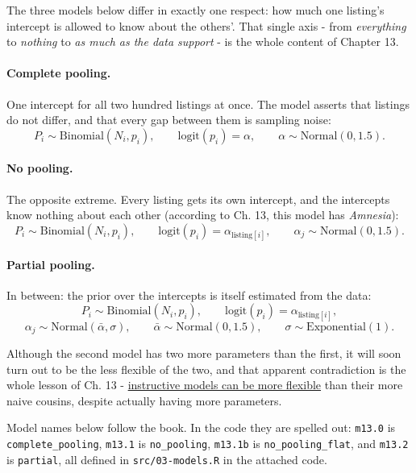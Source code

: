 \documentclass[11pt,a4paper]{article}
\begin{document}
The three models below differ in exactly one respect: how much one listing's
intercept is allowed to know about the others'. That single axis - from
\emph{everything} to \emph{nothing} to \emph{as much as the data support} - is
the whole content of Chapter 13.

\paragraph{Complete pooling.} One intercept for all two hundred listings at
once. The model asserts that listings do not differ, and that every gap between
them is sampling noise:
\[
  P_i \sim \text{Binomial}(N_i, p_i), \qquad
  \text{logit}(p_i) = \alpha, \qquad
  \alpha \sim \text{Normal}(0, 1.5).
\]

\paragraph{No pooling.} The opposite extreme. Every listing gets its own
intercept, and the intercepts
know nothing about each other (according to Ch. 13, this model has \textit{Amnesia}):
\[
  P_i \sim \text{Binomial}(N_i, p_i), \qquad
  \text{logit}(p_i) = \alpha_{\text{listing}[i]}, \qquad
  \alpha_j \sim \text{Normal}(0, 1.5).
\]

\paragraph{Partial pooling.} In between: the prior over the intercepts is itself
estimated from the data:
\[
  P_i \sim \text{Binomial}(N_i, p_i), \qquad
  \text{logit}(p_i) = \alpha_{\text{listing}[i]},
\]
\[
  \alpha_j \sim \text{Normal}(\bar\alpha, \sigma), \qquad
  \bar\alpha \sim \text{Normal}(0, 1.5), \qquad
  \sigma \sim \text{Exponential}(1).
\]

\begin{notebox}
Although the second model has two more parameters than the first, it will soon turn out to be
the less flexible of the two, and that apparent contradiction is the whole
lesson of Ch. 13 - \underline{instructive models can be more flexible} than their more naive cousins, despite actually having more parameters.
\end{notebox}
Model names below follow the book. In the code they are spelled out:
\texttt{m13.0} is \texttt{complete\_pooling}, \texttt{m13.1} is
\texttt{no\_pooling}, \texttt{m13.1b} is \texttt{no\_pooling\_flat}, and
\texttt{m13.2} is \texttt{partial}, all defined in \texttt{src/03-models.R} in
the attached code.
\end{document}
